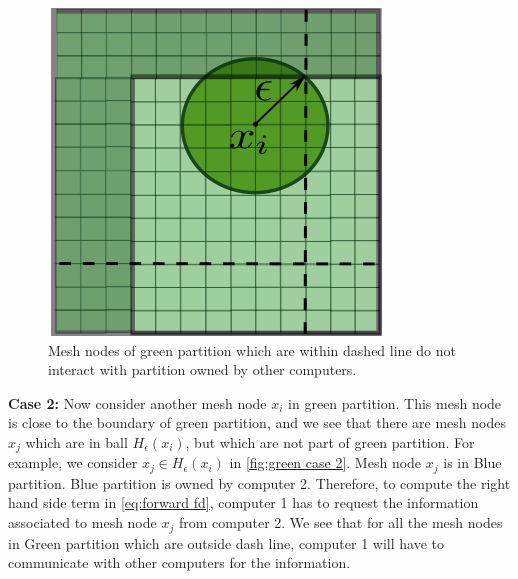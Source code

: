 \documentclass[11pt,twocolumn]{amsart}
\theoremstyle{definition}
\theoremstyle{definition}
\numberwithin{equation}{section}
\numberwithin{equation}{section}
\begin{document}
\begin{figure}[ht]
\centering
\includegraphics[scale=0.5]{mesh_partition_green_case_1.png}
\caption{Mesh nodes of green partition which are within dashed line do not interact with partition owned by other computers.}\label{fig:green case 1}
\end{figure}

\textbf{Case 2: }Now consider another mesh node $x_i$ in green partition. This mesh node is close to the boundary of green partition, and we see that there are mesh nodes $x_j$ which are in ball $H_\epsilon(x_i)$, but which are not part of green partition. For example, we consider $x_j \in H_\epsilon(x_i)$ in \autoref{fig:green case 2}. Mesh node $x_j$ is in Blue partition. Blue partition is owned by computer 2. Therefore, to compute the right hand side term in \autoref{eq:forward fd}, computer 1 has to request the information associated to mesh node $x_j$ from computer 2. We see that for all the mesh nodes in Green partition which are outside dash line, computer 1 will have to communicate with other computers for the information. 
\end{document}
